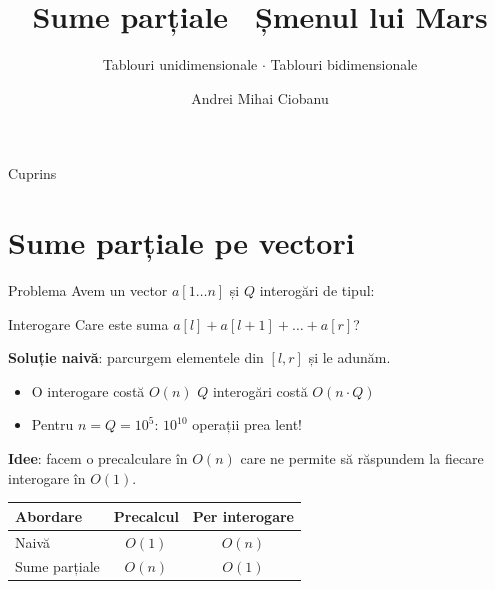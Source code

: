 ﻿\documentclass{beamer}
\title{Sume parțiale \textbar\ Șmenul lui Mars}
\subtitle{Tablouri unidimensionale $\cdot$ Tablouri bidimensionale}
\author{Andrei Mihai Ciobanu}
\institute{Algolymp Summer School}
\date{}
\begin{document}
\begin{frame}[shrink]
  \titlepage
\end{frame}

\begin{frame}{Cuprins}
  \tableofcontents
\end{frame}

\section{Sume parțiale pe vectori}

\begin{frame}{Problema}
  Avem un vector $a[1 \ldots n]$ și $Q$ interogări de tipul:
  \begin{block}{Interogare}
    Care este suma $a[l] + a[l+1] + \ldots + a[r]$?
  \end{block}

  \smallskip
  \textbf{Soluție naivă}: parcurgem elementele din $[l, r]$ și le adunăm.
  \begin{itemize}
    \item O interogare costă $O(n)$ \textemdash{} $Q$ interogări costă $O(n \cdot Q)$
    \item Pentru $n = Q = 10^5$: $10^{10}$ operații \textemdash{} prea lent!
  \end{itemize}

  \smallskip
  \textbf{Idee}: facem o precalculare în $O(n)$ care ne permite să răspundem la fiecare interogare în $O(1)$.

  \begin{center}
  \begin{tabular}{lcc}
    \toprule
    Abordare & Precalcul & Per interogare \\
    \midrule
    Naivă         & $O(1)$    & $O(n)$ \\
    Sume parțiale & $O(n)$    & $O(1)$ \\
    \bottomrule
  \end{tabular}
  \end{center}
\end{frame}
\end{document}
